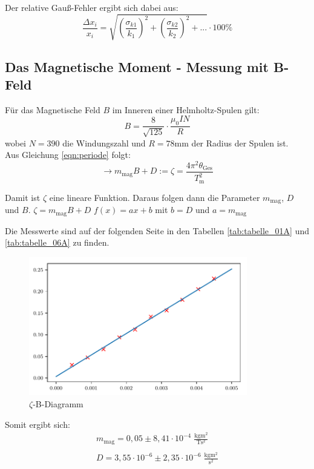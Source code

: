Der relative Gauß-Fehler ergibt sich dabei aus:
\begin{equation}
    \frac{\Delta x_i}{x_i}=\sqrt{(\frac{\sigma_{k1}}{k_1})^2+(\frac{\sigma_{k2}}{k_2})^2+...} \cdot 100\%
    \label{eqn:relfehler}
\end{equation}

\newpage
\subsection{Das Magnetische Moment - Messung mit B-Feld}

Für das Magnetische Feld $B$ im Inneren einer Helmholtz-Spulen gilt:
\begin{equation}
    B= \frac{8}{\sqrt{125}} \cdot \frac{\mu_0 I N}{R}
\end{equation}
wobei $N=390$ die Windungszahl und $R=78$mm der Radius der Spulen ist.\\
Aus Gleichung \ref{eqn:periode}
folgt:
\begin{equation}
    \to m_\text{mag}B+D := \zeta = \frac{4\pi^2\theta_\text{Ges}}{T^2_\text{m}}
\end{equation}

Damit ist $\zeta$ eine lineare Funktion. Daraus folgen dann die Parameter $m_\text{mag}$, $D$ und $B$.\newline
$\zeta = m_\text{mag}B + D$ \to $f(x)=ax+b$ mit $b = D$ und $a=m_\text{mag}$

Die Messwerte sind auf der folgenden Seite in den Tabellen \ref{tab:tabelle_01A} und \ref{tab:tabelle_06A}
zu finden.
\begin{figure}[h]
    \centering
    \includegraphics[width=0.85\textwidth, height=0.5\textwidth]{build/plot.pdf}
    \caption{$\zeta$-B-Diagramm}        
    \label{fig:Diagramm}
\end{figure}

Somit ergibt sich:
\begin{gather*}
    m_\text{mag} = 0,05 \pm 8,41 \cdot 10^{-4} \;\mathrm{\frac{kgm^2}{Ts^2}}\\\\
    D = 3,55\cdot10^{-6} \pm 2,35 \cdot 10^{-6} \;\mathrm{\frac{kgm^2}{s^2}}
\end{gather*}

